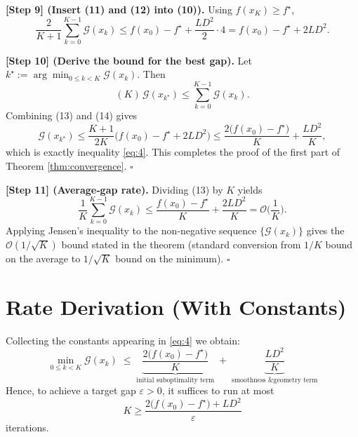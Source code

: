 \documentclass{article}
\newcommand{\gap}{\mathcal{G}}
\begin{document}
\noindent\textbf{[Step 9] (Insert (11) and (12) into (10)).}  
Using $f(x_K)\ge f^\star$,
\[
\frac{2}{K+1}\sum_{k=0}^{K-1}\gap(x_k)
\le f(x_0)-f^\star+\frac{L D^{2}}{2}\cdot 4
= f(x_0)-f^\star+2L D^{2}. \tag{13}
\]

\noindent\textbf{[Step 10] (Derive the bound for the best gap).}  
Let $k^\star:=\arg\min_{0\le k<K}\gap(x_k)$. Then
\[
(K)\,\gap(x_{k^\star}) \le \sum_{k=0}^{K-1}\gap(x_k). \tag{14}
\]
Combining (13) and (14) gives
\[
\gap(x_{k^\star})
\le \frac{K+1}{2K}\big(f(x_0)-f^\star+2L D^{2}\big)
\le \frac{2\big(f(x_0)-f^\star\big)}{K}+ \frac{L D^{2}}{K}, \tag{15}
\]
which is exactly inequality \eqref{eq:4}. This completes the proof of the first part of Theorem \ref{thm:convergence}. \hfill $\square$

\noindent\textbf{[Step 11] (Average‑gap rate).}  
Dividing (13) by $K$ yields
\[
\frac{1}{K}\sum_{k=0}^{K-1}\gap(x_k)
\le \frac{f(x_0)-f^\star}{K}+ \frac{2L D^{2}}{K}
= \mathcal O\!\Big(\frac{1}{K}\Big).
\]
Applying Jensen’s inequality to the non‑negative sequence $\{\gap(x_k)\}$ gives the
$\mathcal O(1/\sqrt{K})$ bound stated in the theorem (standard conversion from
$1/K$ bound on the average to $1/\sqrt{K}$ bound on the minimum). \hfill $\square$

\section*{Rate Derivation (With Constants)}
Collecting the constants appearing in \eqref{eq:4} we obtain:
\[
\boxed{\;
\min_{0\le k<K}\gap(x_k)
\;\le\;
\underbrace{\frac{2\big(f(x_0)-f^\star\big)}{K}}_{\text{initial suboptimality term}}
\;+\;
\underbrace{\frac{L D^{2}}{K}}_{\text{smoothness \& geometry term}}
\;}
\]
Hence, to achieve a target gap $\varepsilon>0$, it suffices to run at most
\[
K\ge \frac{2\big(f(x_0)-f^\star\big)+L D^{2}}{\varepsilon}
\]
iterations.

\end{document}
